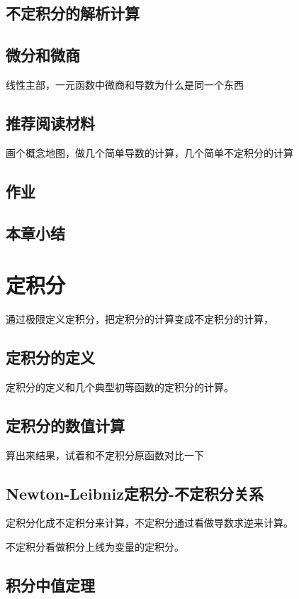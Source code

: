 \documentclass{ctexbook}
\newcommand{\ChapLabel}[1]{\label{#1}}
\begin{document}
\section{不定积分的解析计算}

\section{微分和微商}
线性主部，一元函数中微商和导数为什么是同一个东西

\section{推荐阅读材料}
画个概念地图，做几个简单导数的计算，几个简单不定积分的计算

\section{作业}

\section{本章小结}

\chapter{定积分}
\ChapLabel{Chap:Integral}
通过极限定义定积分，把定积分的计算变成不定积分的计算，

\section{定积分的定义}
定积分的定义和几个典型初等函数的定积分的计算。

\section{定积分的数值计算}
算出来结果，试着和不定积分原函数对比一下

\section{Newton-Leibniz定积分-不定积分关系}
定积分化成不定积分来计算，不定积分通过看做导数求逆来计算。

不定积分看做积分上线为变量的定积分。

\section{积分中值定理}
\end{document}
